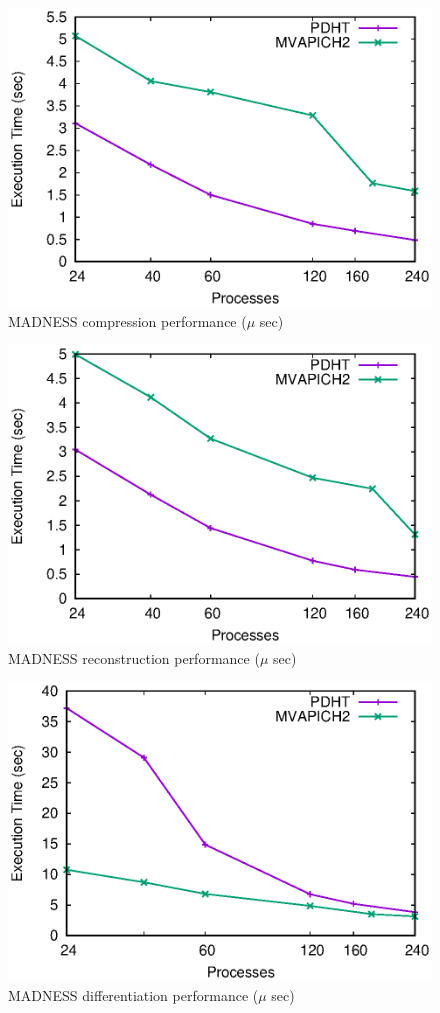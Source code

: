 \begin{figure}
  \centering
  \includegraphics[width=.9\linewidth]{plots/compress}
  \caption{MADNESS compression performance ($\mu$ sec)}
  \label{fig:mad-compress}
\end{figure}

\begin{figure}
  \centering
  \includegraphics[width=.9\linewidth]{plots/reconstruct}
  \caption{MADNESS reconstruction performance ($\mu$ sec)}
  \label{fig:mad-reconstruct}
\end{figure}


\begin{figure}
  \centering
  \includegraphics[width=.9\linewidth]{plots/diff}
  \caption{MADNESS differentiation performance ($\mu$ sec)}
  \label{fig:mad-diff}
\end{figure}

